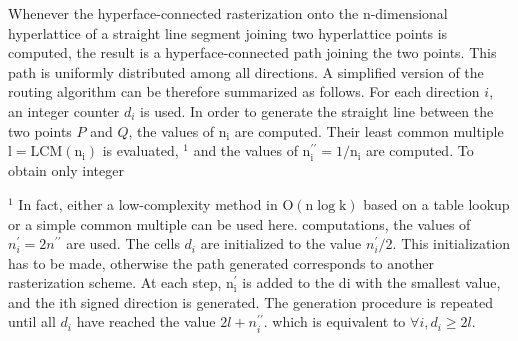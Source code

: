 \begin{CJK}{UTF8}{gbsn}
Whenever the hyperface-connected rasterization onto the n-dimensional hyperlattice of a straight line segment joining two hyperlattice points is computed, the result is a hyperface-connected path joining the two points. This path is uniformly distributed among all directions. A simplified version of the routing algorithm can be therefore summarized as follows. For each direction $i$, an integer counter $d_{i}$ is used. In order to generate the straight line between the two points $P$ and $Q$, the values of $\mathrm{n}_{\mathrm{i}}$ are computed. Their least common multiple $\mathrm{l}=\mathrm{LCM}\left(\mathrm{n}_{\mathrm{i}}\right)$ is evaluated, ${ }^{1}$ and the values of $\mathrm{n}_{\mathrm{i}}^{\prime \prime}=1 / \mathrm{n}_{\mathrm{i}}$ are computed. To obtain only integer

${ }^{1}$ In fact, either a low-complexity method in $\mathrm{O}(\mathrm{n} \log \mathrm{k})$ based on a table lookup or a simple common multiple can be used here. computations, the values of $n_{i}^{\prime}=2 n^{\prime \prime}$ are used. The cells $d_{i}$ are initialized to the value $n_{i}^{\prime} / 2$. This initialization has to be made, otherwise the path generated corresponds to another rasterization scheme. At each step, $\mathrm{n}_{\mathrm{i}}^{\prime}$ is added to the di with the smallest value, and the ith signed direction is generated. The generation procedure is repeated until all $d_{i}$ have reached the value $2 l+n_{i}^{\prime \prime}$. which is equivalent to $\forall i, d_{i} \geq 2 l$.\\




\end{CJK}
